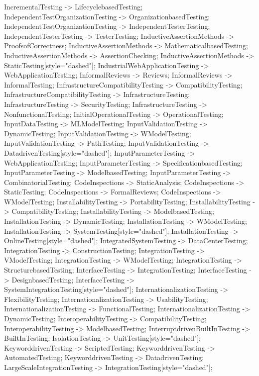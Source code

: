 \documentclass{article}
\begin{document}
{IncrementalTesting -> LifecyclebasedTesting;
IndependentTestOrganizationTesting -> OrganizationbasedTesting;
IndependentTestOrganizationTesting -> IndependentTesterTesting;
IndependentTesterTesting -> TesterTesting;
InductiveAssertionMethods -> ProofsofCorrectness;
InductiveAssertionMethods -> MathematicalbasedTesting;
InductiveAssertionMethods -> AssertionChecking;
InductiveAssertionMethods -> StaticTesting[style="dashed"];
IndustrialWebApplicationTesting -> WebApplicationTesting;
InformalReviews -> Reviews;
InformalReviews -> InformalTesting;
InfrastructureCompatibilityTesting -> CompatibilityTesting;
InfrastructureCompatibilityTesting -> InfrastructureTesting;
InfrastructureTesting -> SecurityTesting;
InfrastructureTesting -> NonfunctionalTesting;
InitialOperationalTesting -> OperationalTesting;
InputDataTesting -> MLModelTesting;
InputValidationTesting -> DynamicTesting;
InputValidationTesting -> WModelTesting;
InputValidationTesting -> PathTesting;
InputValidationTesting -> DatadrivenTesting[style="dashed"];
InputParameterTesting -> WebApplicationTesting;
InputParameterTesting -> SpecificationbasedTesting;
InputParameterTesting -> ModelbasedTesting;
InputParameterTesting -> CombinatorialTesting;
CodeInspections -> StaticAnalysis;
CodeInspections -> StaticTesting;
CodeInspections -> FormalReviews;
CodeInspections -> WModelTesting;
InstallabilityTesting -> PortabilityTesting;
InstallabilityTesting -> CompatibilityTesting;
InstallabilityTesting -> ModelbasedTesting;
InstallationTesting -> DynamicTesting;
InstallationTesting -> WModelTesting;
InstallationTesting -> SystemTesting[style="dashed"];
InstallationTesting -> OnlineTesting[style="dashed"];
IntegratedSystemTesting -> DataCenterTesting;
IntegrationTesting -> ConstructionTesting;
IntegrationTesting -> VModelTesting;
IntegrationTesting -> WModelTesting;
IntegrationTesting -> StructurebasedTesting;
InterfaceTesting -> IntegrationTesting;
InterfaceTesting -> DesignbasedTesting;
InterfaceTesting -> SystemIntegrationTesting[style="dashed"];
InternationalizationTesting -> FlexibilityTesting;
InternationalizationTesting -> UsabilityTesting;
InternationalizationTesting -> FunctionalTesting;
InternationalizationTesting -> DynamicTesting;
InteroperabilityTesting -> CompatibilityTesting;
InteroperabilityTesting -> ModelbasedTesting;
InterruptdrivenBuiltInTesting -> BuiltInTesting;
IsolationTesting -> UnitTesting[style="dashed"];
KeyworddrivenTesting -> ScriptedTesting;
KeyworddrivenTesting -> AutomatedTesting;
KeyworddrivenTesting -> DatadrivenTesting;
LargeScaleIntegrationTesting -> IntegrationTesting[style="dashed"];
}
\end{document}
